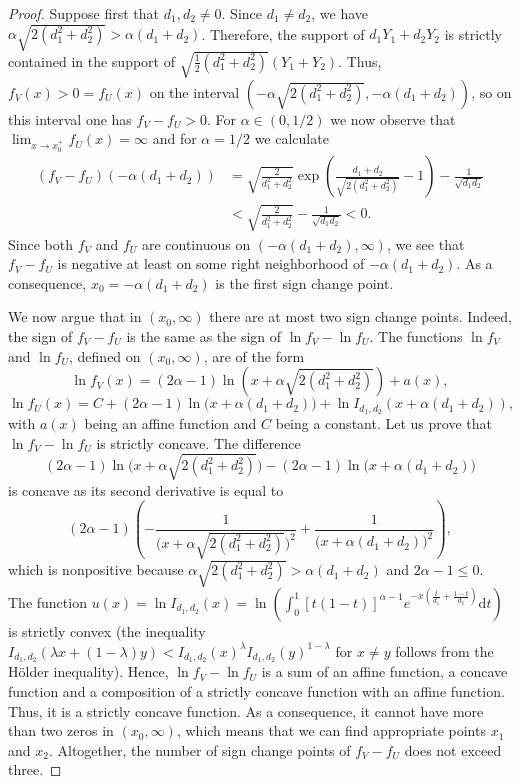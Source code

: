 \documentclass[11pt]{amsart}
\newcommand{\dd}{\mathrm{d}}
\newcommand{\1}{\mathbf{1}}
\theoremstyle{definition}
\theoremstyle{definition}
\theoremstyle{remark}
\begin{document}
\begin{proof}
Suppose first that $d_1, d_2 \ne 0$. Since $d_1 \ne d_2$, we have $\alpha\sqrt{2(d_1^2+d_2^2)}>\alpha(d_1+d_2)$. Therefore, the support of $d_1 Y_1 + d_2 Y_2$ is strictly contained in the support of $\sqrt{\frac12(d_1^2+d_2^2)}( Y_1 + Y_2)$. Thus, $f_{V}(x)>0 = f_{U}(x)$ on the interval $(-\alpha\sqrt{2(d_1^2+d_2^2)}, -\alpha(d_1+d_2))$, so on this interval one has $f_{V} - f_{U}>0$. For $\alpha \in (0, 1/2)$ we now observe that $\lim_{x\rightarrow x_0^+}f_U(x) = \infty$ and for $\alpha=1/2$ we calculate 
\begin{align*}
(f_{V} - f_{U})(-\alpha(d_1+d_2)) &=  \sqrt{\frac{2}{d_1^2+d_2^2}} \exp \left(\frac{d_1+d_2}{\sqrt{2(d_1^2+d_2^2)}} -1 \right) - \frac{1}{\sqrt{d_1 d_2}}  \\
& < \sqrt{\frac{2}{d_1^2+d_2^2}} - \frac{1}{\sqrt{d_1d_2}} < 0.
\end{align*}
Since both $f_{V}$ and $f_{U}$ are continuous on $(-\alpha(d_1+d_2),\infty)$, we see that $f_{V} - f_{U}$ is negative at least on some right neighborhood of $-\alpha(d_1+d_2)$. As a consequence, $x_0=-\alpha(d_1+d_2)$ is the first sign change point. 

We now argue that in $(x_0,\infty)$ there are at most two sign change points. 
Indeed, the sign of $f_{V} - f_{U}$ is the same as the sign of $\ln f_{V} - \ln f_{U}$. The functions $\ln f_{V}$ and $\ln f_{U}$, defined on $(x_0,\infty)$, are of the form 
\[
    \ln f_{V}(x) = (2\alpha-1)\ln\left(x+\alpha\sqrt{2(d_1^2+d_2^2)}\right) + a(x),
\]
\[
    \ln f_{U}(x) = C + (2\alpha-1)\ln\bigg(x+\alpha(d_1+d_2)\bigg) + \ln I_{d_1, d_2}(x+\alpha(d_1+d_2)),
\]
with $a(x)$ being an affine function and $C$ being a constant. Let us prove that $\ln f_{V} - \ln f_{U}$ is strictly concave. The difference 
\[
    (2\alpha-1)\ln\Big(x+\alpha\sqrt{2(d_1^2+d_2^2)}\Big) - (2\alpha-1)\ln\Big(x+\alpha(d_1+d_2)\Big)
\]
is concave as its second derivative is equal to 
\[
    (2\alpha-1)\left(-\frac{1}{\Big(x+\alpha\sqrt{2(d_1^2+d_2^2)}\Big)^2} + \frac{1}{\Big(x+\alpha(d_1+d_2)\Big)^2}\right),
\]
which is nonpositive because $\alpha\sqrt{2\left(d_1^2+d_2^2\right)} > \alpha\left(d_1+d_2\right)$ and $2\alpha-1\leq0$.
The function $u(x)=\ln I_{d_1, d_2}(x)= \ln\left(\int_0^1 [t(1-t)]^{\alpha-1} e^{-x\left(\frac{t}{d_1}+\frac{1-t}{d_2}\right)}\dd t\right)$ is strictly convex (the inequality $I_{d_1, d_2}(\lambda x + (1-\lambda)y ) < I_{d_1, d_2}(x)^\lambda I_{d_1, d_2}(y)^{1-\lambda}$ for $x \ne y$ follows from the H\"older inequality). Hence, $\ln f_{V} - \ln f_U$ is a sum of an affine function, a concave function and a composition of a strictly concave function with an affine function. Thus, it is a strictly concave function. As a consequence, it cannot have more than two zeros in $(x_0,\infty)$, which means that we can find appropriate points $x_1$ and $x_2$. Altogether, the number of sign change points of $f_{V} - f_{U}$ does not exceed three.     


\end{proof}
\end{document}
